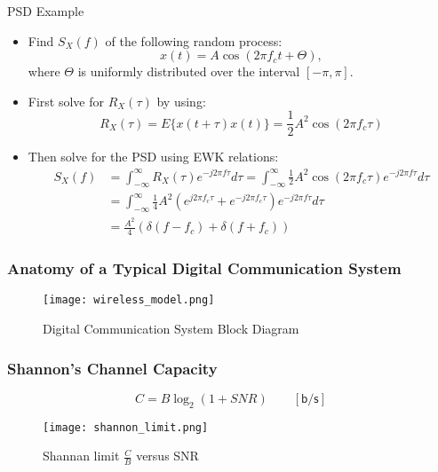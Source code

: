 \documentclass{beamer}
\begin{document}
\begin{frame}[fragile]{PSD Example}

  \begin{itemize}
    \item Find $S_X(f)$ of the following random process:
    \begin{equation}
        x(t)=A\cos(2\pi{f_c}t+\Theta),\nonumber
    \end{equation}
    where $\Theta$ is uniformly distributed over the interval $[-\pi,\pi]$.
    \item First solve for $R_X(\tau)$ by using:
    \begin{equation}
        R_X(\tau)=E\{x(t+\tau)x(t)\}=\frac{1}{2}A^2\cos(2\pi{f_c}\tau)\nonumber
    \end{equation}
    \item Then solve for the PSD using EWK relations:
    \begin{equation}
    \begin{split}
        S_X(f)&=\int_{-\infty}^{\infty}R_X(\tau)e^{-j2\pi{f}\tau}d\tau=\int_{-\infty}^{\infty}\frac{1}{2}A^2\cos(2\pi{f_c}\tau)e^{-j2\pi{f}\tau}d\tau\\
        &=\int_{-\infty}^{\infty}\frac{1}{4}A^2\left(e^{j2\pi{f_c}\tau}+e^{-j2\pi{f_c}\tau}\right)e^{-j2\pi{f}\tau}d\tau\\
        &=\frac{A^2}{4}(\delta(f-f_c)+\delta(f+f_c))\nonumber
    \end{split}
    \end{equation}
  \end{itemize}
  
\end{frame}



\frame
{
  \frametitle{Anatomy of a Typical Digital Communication System}

\begin{figure}
    \centering
    \texttt{[image: wireless\_model.png]}
    \caption{Digital Communication System Block Diagram}
    \label{8}
\end{figure}
}

\frame
{
  \frametitle{Shannon's Channel Capacity}
  \begin{equation}
    C=B\log_{2}(1+SNR)\qquad\mathsf{[b/s]}
  \end{equation}
  \begin{figure}
      \centering
      \texttt{[image: shannon\_limit.png]}
      \caption{Shannan limit $\frac{C}{B}$ versus SNR }
      \label{}
  \end{figure}
}
\end{document}

